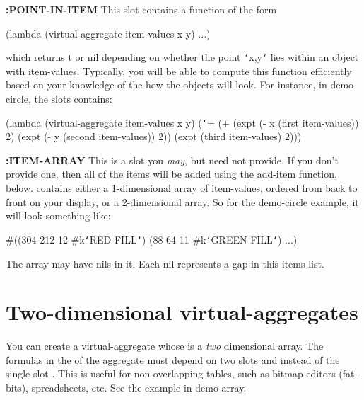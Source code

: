 \vspace{1 line}
\begin{group}
{\bf :POINT-IN-ITEM}\newline{}
This slot contains a function of the form
\begin{programexample}
(lambda (virtual-aggregate item-values x y) ...)
\end{programexample}
which returns {\sc t} or {\sc nil} depending on whether the point {\tt\char`\<}x,y{\tt\char`\>} lies within
an  object with  item-values.
Typically, you will be able to compute this function efficiently based
on your knowledge of the how the objects will look.
For instance, in demo-circle, the  slots contains:
\end{group}

\begin{programexample}
(lambda (virtual-aggregate item-values x y)
  ({\tt\char`\<}= (+ (expt (- x (first item-values)) 2)
         (expt (- y (second item-values)) 2))
      (expt (third item-values) 2)))
\end{programexample}

{\bf :ITEM-ARRAY}\newline{}
This is a slot you {\it may}, but need not provide.  If you don't provide
one, then all of the items will be added using the add-item function, below.
 contains either a 1-dimensional array of item-values, ordered
from back to front on your display, or a 2-dimensional array.  So for the
demo-circle example, it will look something like:
\begin{programexample}
\#((304 212 12 \#k{\tt\char`\<}RED-FILL{\tt\char`\>})
  (88 64 11 \#k{\tt\char`\<}GREEN-FILL{\tt\char`\>})
  ...)
\end{programexample}
The array may have {\sc nil}s in it.  Each {\sc nil} represents a gap in this items
list.

\section{Two-dimensional virtual-aggregates}
You can create a virtual-aggregate whose  is a {\it two}
dimensional array.  The formulas in the  of the aggregate
must depend on two slots  and  instead of the single
slot .  This is useful for non-overlapping tables, such as
bitmap editors (fat-bits), spreadsheets, etc.  See the example in
demo-array.


